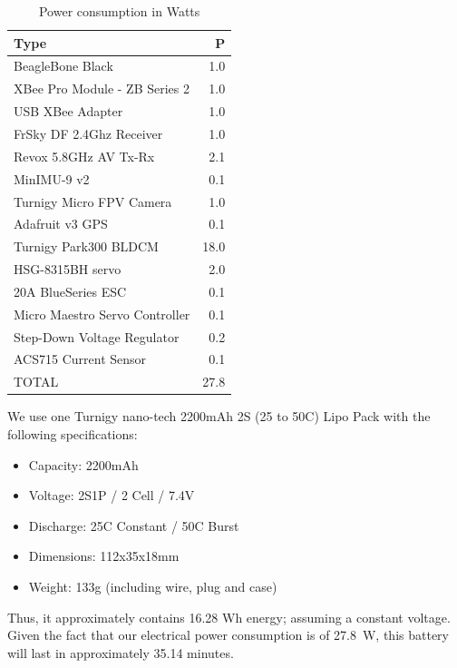 \documentclass[a4paper, 10pt, twocolumn, titlepage]{article}
\newcommand{\head}[1]{\textnormal{\textbf{#1}}} %
\begin{document}
\begin{table}[!tb]
\centering
\caption{Power consumption in Watts}
  \begin{tabular}{lr}
    \toprule[1.5pt]
    \head{Type} & \head{P}  \\
    \toprule[1.0pt]
    
    BeagleBone Black & 
    1.0 \\
    
    \midrule
    XBee Pro Module - ZB Series 2 & 
    1.0 \\
    
    USB XBee Adapter & 
    1.0 \\
    
    FrSky DF 2.4Ghz Receiver & 
    1.0 \\
    
    Revox 5.8GHz AV Tx-Rx &
    2.1 \\
    
    \midrule
    MinIMU-9 v2 &
    0.1 \\
    
    Turnigy Micro FPV Camera &
    1.0 \\
    
    Adafruit v3 GPS &
    0.1 \\
    
    \midrule
    Turnigy Park300 BLDCM &
    18.0 \\
    
    HSG-8315BH servo &
    2.0 \\
    
    20A BlueSeries ESC &
    0.1 \\
    
    Micro Maestro Servo Controller &
    0.1 \\
    
    Step-Down Voltage Regulator &
    0.2 \\
    
    ACS715 Current Sensor & 
    0.1 \\
    
    \midrule
    TOTAL  &
    27.8 \\
        
    \bottomrule[1.5pt]
  \end{tabular}
\label{tbl:pwr_cons}
\end{table}

We use one Turnigy nano-tech 2200mAh 2S (25 to 50C) Lipo Pack with the following specifications:
\begin{itemize}
\itemsep-1mm
  \item Capacity: 2200mAh
  \item Voltage: 2S1P / 2 Cell / 7.4V
  \item Discharge: 25C Constant / 50C Burst
  \item Dimensions: 112x35x18mm
  \item Weight: 133g (including wire, plug and case)
\end{itemize}
Thus, it approximately contains 16.28 Wh energy; assuming a constant voltage.
Given the fact that our electrical power consumption is of 27.8~W, this battery will last in approximately 35.14 minutes.
\end{document}
